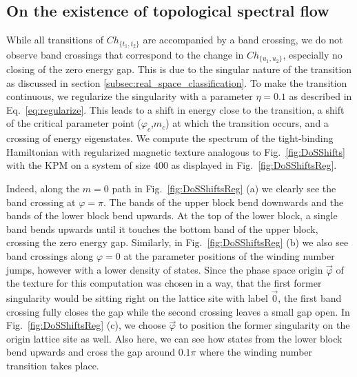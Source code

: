 \documentclass[submission, Phys]{SciPost}
\begin{document}
\subsection{On the existence of topological spectral flow}
While all transitions of $Ch_{\lbrace t_1, t_2 \rbrace }$ are accompanied by a band crossing, we do not observe band crossings that correspond to the change in $Ch_{\lbrace u_1, u_2 \rbrace }$, especially no closing of the zero energy gap. This is due to the singular nature of the transition as discussed in section \ref{subsec:real_space_classification}. To make the transition continuous, we regularize the singularity with a parameter $\eta=0.1$ as described in Eq.~\eqref{eq:regularize}. This leads to a shift in energy close to the transition, a shift of the critical parameter point ($\varphi_c$,$m_c$) at which the transition occurs, and a crossing of energy eigenstates.
We compute the spectrum of the tight-binding Hamiltonian with regularized magnetic texture analogous to Fig.~\ref{fig:DoSShifts} with the KPM on a system of size $400$ as displayed in Fig.~\ref{fig:DoSShiftsReg}.

Indeed, along the $m=0$ path in Fig.~\ref{fig:DoSShiftsReg} (a) we clearly see the band crossing at $\varphi=\pi$. The bands of the upper block bend downwards and the bands of the lower block bend upwards. At the top of the lower block, a single band bends upwards until it touches the bottom band of the upper block, crossing the zero energy gap.
Similarly, in Fig.~\ref{fig:DoSShiftsReg} (b) we also see band crossings along $\varphi=0$ at the parameter positions of the winding number jumps, however with a lower density of states. Since the phase space origin $\vec{\varphi}$ of the texture for this computation was chosen in a way, that the first former singularity would be sitting right on the lattice site with label $\vec{0}$, the first band crossing fully closes the gap while the second crossing leaves a small gap open.
In Fig.~\ref{fig:DoSShiftsReg} (c), we choose $\vec{\varphi}$ to position the former singularity on the origin lattice site as well. Also here, we can see how states from the lower block bend upwards and cross the gap around $0.1\pi$ where the winding number transition takes place.
\figureXII
\figureXIII
\end{document}
